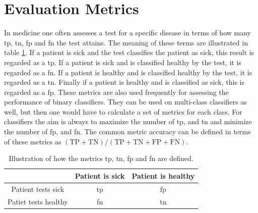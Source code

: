 \section{Evaluation Metrics} \label{sec:eval_metrics}
In medicine one often assesses a test for a specific disease in terms of how many \acrfull{tp}, \acrfull{tn}, \acrfull{fp} and \acrfull{fn} the test attains. The meaning of these terms are illustrated in table \ref{tab:ttpnffpn}. If a patient is sick and the test classifies the patient as sick, this result is regarded as a \acrlong{tp}. If a patient is sick and is classified healthy by the test, it is regarded as a \acrlong{fn}. If a patient is healthy and is classified healthy by the test, it is regarded as a \acrlong{tn}. Finally if a patient is healthy and is classified as sick, this is regarded as a \acrlong{fp}. These metrics are also used frequently for assessing the performance of binary classifiers. They can be used on multi-class classifiers as well, but then one would have to calculate a set of metrics for each class. For classifiers the aim is always to maximize the number of \acrshort{tp}, and \acrshort{tn} and minimize the number of \acrshort{fp}, and \acrshort{fn}. The common metric accuracy can be defined in terms of these metrics as $(\mathrm{TP} + \mathrm{TN}) / (\mathrm{TP} + \mathrm{TN} + \mathrm{FP} + \mathrm{FN})$.

\begin{table}
    \centering
    \begin{tabular}{c|c|c|}
        \toprule
                             & Patient is sick & Patient is healthy \\
        \midrule
        Patient tests sick   & \acrshort{tp}   & \acrshort{fp} \\
        \midrule
        Patiet tests healthy & \acrshort{fn}   & \acrshort{tn} \\
        \bottomrule
    \end{tabular}
    \caption{Illustration of how the metrics \acrshort{tp}, \acrshort{tn}, \acrfull{fp} and \acrfull{fn} are defined.}
    \label{tab:ttpnffpn}
\end{table}

